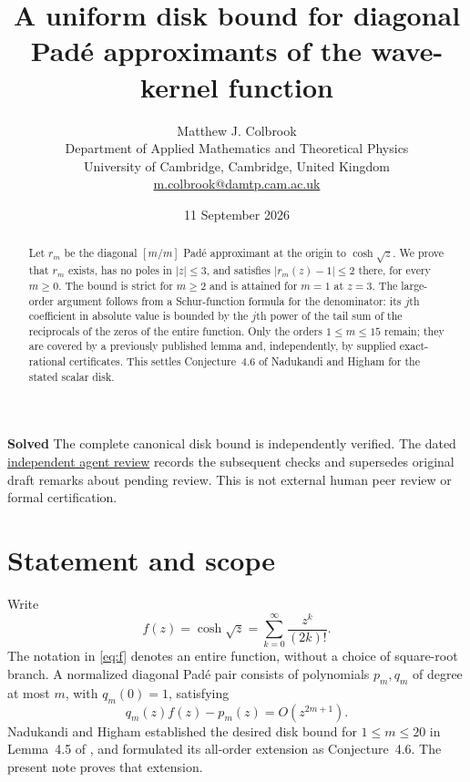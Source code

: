 \documentclass[11pt]{article}
\title{A uniform disk bound for diagonal Pad\'e approximants of the wave-kernel function}
\author{Matthew J. Colbrook\\\small Department of Applied Mathematics and Theoretical Physics\\\small University of Cambridge, Cambridge, United Kingdom\\\small\href{mailto:m.colbrook@damtp.cam.ac.uk}{m.colbrook@damtp.cam.ac.uk}}
\date{11 September 2026}
\theoremstyle{remark}\newtheorem{remark}[theorem]{Remark}
\begin{document}
\maketitle

\noindent\textbf{Solved} The complete canonical disk bound is independently verified.
The dated \href{https://github.com/MColbrook/OpenProblemsInNLA/blob/codex/colbrook-matrix-function-resolutions/references/colbrook-matrix-functions-2026-09-11/verification/reviews/MF-03-review.md}{independent agent review} records the subsequent checks and supersedes original draft remarks about pending review. This is not external human peer review or formal certification.
\par\medskip

\begin{abstract}
Let $r_m$ be the diagonal $[m/m]$ Pad\'e approximant at the origin to $\cosh\sqrt z$. We prove that $r_m$ exists, has no poles in $|z|\leq3$, and satisfies $|r_m(z)-1|\leq2$ there, for every $m\geq0$. The bound is strict for $m\geq2$ and is attained for $m=1$ at $z=3$. The large-order argument follows from a Schur-function formula for the denominator: its $j$th coefficient in absolute value is bounded by the $j$th power of the tail sum of the reciprocals of the zeros of the entire function. Only the orders $1\leq m\leq15$ remain; they are covered by a previously published lemma and, independently, by supplied exact-rational certificates. This settles Conjecture~4.6 of Nadukandi and Higham for the stated scalar disk.
\end{abstract}

\section{Statement and scope}
Write
\begin{equation}\label{eq:f}
f(z)=\cosh\sqrt z=\sum_{k=0}^{\infty}\frac{z^k}{(2k)!}.
\end{equation}
The notation in \eqref{eq:f} denotes an entire function, without a choice of square-root branch. A normalized diagonal Pad\'e pair consists of polynomials $p_m,q_m$ of degree at most $m$, with $q_m(0)=1$, satisfying
\begin{equation}\label{eq:pade}
q_m(z)f(z)-p_m(z)=O(z^{2m+1}).
\end{equation}
Nadukandi and Higham established the desired disk bound for $1\leq m\leq20$ in Lemma~4.5 of \cite{NH}, and formulated its all-order extension as Conjecture~4.6. The present note proves that extension.
\end{document}
